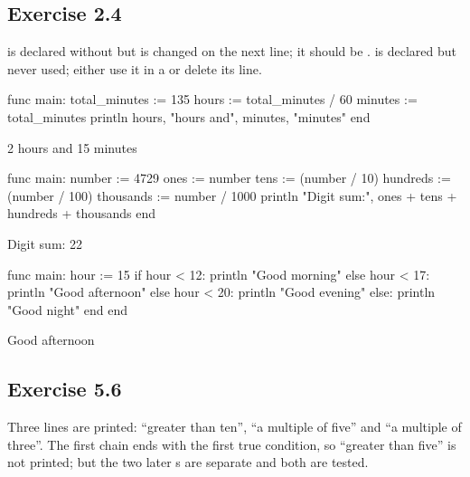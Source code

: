 \subsection*{Exercise 2.4}
 is declared without  but is changed on the next
line; it should be .  is declared
but never used; either use it in a  or delete its line.


\begin{salamcode}
func main:
    total_minutes := 135
    hours := total_minutes / 60
    minutes := total_minutes %
    println hours, "hours and", minutes, "minutes"
end
\end{salamcode}
\begin{salamout}
2 hours and 15 minutes
\end{salamout}


\begin{salamcode}
func main:
    number := 4729
    ones := number %
    tens := (number / 10) %
    hundreds := (number / 100) %
    thousands := number / 1000
    println "Digit sum:", ones + tens + hundreds + thousands
end
\end{salamcode}
\begin{salamout}
Digit sum: 22
\end{salamout}


\begin{salamcode}
func main:
    hour := 15
    if hour < 12:
        println "Good morning"
    else hour < 17:
        println "Good afternoon"
    else hour < 20:
        println "Good evening"
    else:
        println "Good night"
    end
end
\end{salamcode}
\begin{salamout}
Good afternoon
\end{salamout}

\subsection*{Exercise 5.6}
Three lines are printed: ``greater than ten'', ``a multiple of five'' and
``a multiple of three''. The first chain ends with the first true condition,
so ``greater than five'' is not printed; but the two later s are
separate and both are tested.

